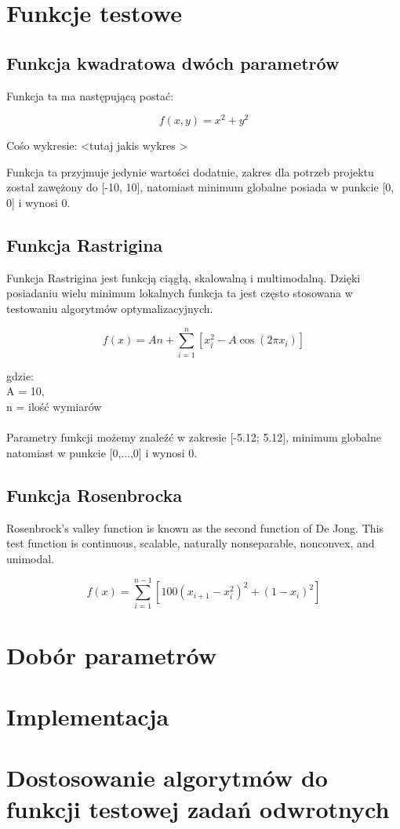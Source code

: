 \documentclass[twoside]{projektInzynierskiMS1}
\newcommand{\newLine}{~\\}
\newcommand{\si}{ś}
\begin{document}
\section{Funkcje testowe}
	\subsection{Funkcja kwadratowa dwóch parametrów}
	Funkcja ta ma następującą postać:

\[f(x, y) = x^2 + y^2 \]

Co\si o wykresie:
<tutaj jakis wykres >

Funkcja ta przyjmuje jedynie warto\si ci dodatnie, zakres dla potrzeb projektu został zawężony do [-10, 10], natomiast minimum globalne posiada w punkcie [0, 0] i wynosi 0. 
	\subsection{Funkcja Rastrigina}
	Funkcja Rastrigina jest funkcją ciągłą, skalowalną i multimodalną. Dzięki posiadaniu wielu minimum lokalnych funkcja ta jest często stosowana w testowaniu algorytmów optymalizacyjnych. 

\[f(x) = An + \sum_{i=1}^{n} [x_i^2 - A \cos{(2 \pi x_i)}] \]

gdzie: \\
A = 10, \\
n = ilo\si ć wymiarów \\ \newLine
Parametry funkcji możemy znaleźć w zakresie [-5.12; 5.12], minimum globalne natomiast w punkcie [0,...,0] i wynosi 0.
	\subsection{Funkcja Rosenbrocka}
	Rosenbrock's valley function is known as the second function of De Jong. This test function is continuous, scalable, naturally nonseparable, nonconvex, and unimodal.


\[f(x) = \sum_{i=1}^{n-1} [100(x_{i+1} - x_i^2)^2 + (1- x_i)^2 ]\]
\section{Dobór parametrów}
\section{Implementacja}
\section{Dostosowanie algorytmów do funkcji testowej zadań odwrotnych}
\end{document}
